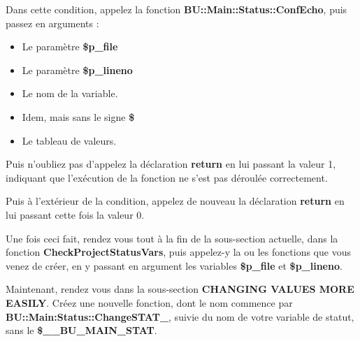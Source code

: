 \documentclass[a4paper,10pt]{article}
\begin{document}
\begin{justify}
    Dans cette condition, appelez la fonction \textbf{\color{mauve}BU::Main::Status::ConfEcho}, puis passez en arguments :

    \begin{itemize}
        \item Le paramètre \textbf{\color{orange}\$p\_file}\\

        \item Le paramètre \textbf{\color{orange}\$p\_lineno}\\

        \item Le nom de la variable.\\

        \item Idem, mais sans le signe \textbf{\$}\\

        \item Le tableau de valeurs.
    \end{itemize}
\end{justify}

\begin{justify}
    Puis n'oubliez pas d'appelez la déclaration \textbf{\color{gray}return} en lui passant la valeur 1, indiquant que l'exécution de la fonction ne s'est pas déroulée correctement.
\end{justify}

\begin{justify}
    Puis à l'extérieur de la condition, appelez de nouveau la déclaration \textbf{\color{gray}return} en lui passant cette fois la valeur 0.
\end{justify}

\begin{justify}
    Une fois ceci fait, rendez vous tout à la fin de la sous-section actuelle, dans la fonction \textbf{\color{mauve}CheckProjectStatusVars}, puis appelez-y la ou les fonctions que vous venez de créer, en y passant en argument les variables \textbf{\color{orange}\$p\_file} et \textbf{\color{orange}\$p\_lineno}.\\[1\baselineskip]
\end{justify}


\begin{justify}
    Maintenant, rendez vous dans la sous-section \textbf{CHANGING VALUES MORE EASILY}. Créez une nouvelle fonction, dont le nom commence par \textbf{\color{mauve}BU::Main:Status::ChangeSTAT\_}, suivie du nom de votre variable de statut, sans le \textbf{\color{orange}\$\_\_BU\_MAIN\_STAT}.
\end{justify}
\end{document}
